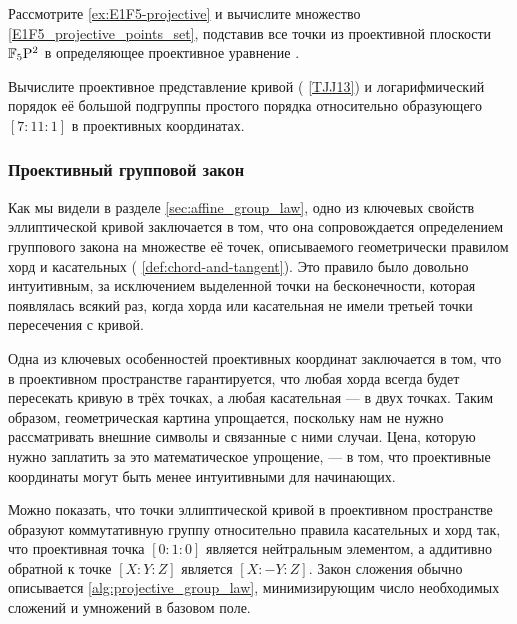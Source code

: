 \begin{exercise}
Рассмотрите \examplename{} \ref{ex:E1F5-projective} и вычислите множество \eqref{E1F5_projective_points_set}, подставив все точки из проективной плоскости $\mathbb{F}_5\mathrm{P}^2$ в определяющее проективное уравнение .
\end{exercise}

\begin{exercise}
Вычислите проективное представление кривой  (\examplename{} \ref{TJJ13}) и логарифмический порядок её большой подгруппы простого порядка относительно образующего $[7:11:1]$ в проективных координатах.
\end{exercise}

\subsubsection{Проективный групповой закон}
\label{sec:projective_group_law}
Как мы видели в разделе \ref{sec:affine_group_law}, одно из ключевых свойств эллиптической кривой заключается в том, что она сопровождается определением группового закона на множестве её точек, описываемого геометрически правилом хорд и касательных ( \ref{def:chord-and-tangent}). Это правило было довольно интуитивным, за исключением выделенной точки на бесконечности, которая появлялась всякий раз, когда хорда или касательная не имели третьей точки пересечения с кривой.

Одна из ключевых особенностей проективных координат заключается в том, что в проективном пространстве гарантируется, что любая хорда всегда будет пересекать кривую в трёх точках, а любая касательная — в двух точках. Таким образом, геометрическая картина упрощается, поскольку нам не нужно рассматривать внешние символы и связанные с ними случаи. Цена, которую нужно заплатить за это математическое упрощение, — в том, что проективные координаты могут быть менее интуитивными для начинающих.

Можно показать, что точки эллиптической кривой в проективном пространстве образуют коммутативную группу относительно правила касательных и хорд так, что проективная точка $[0:1:0]$ является нейтральным элементом, а аддитивно обратной к точке $[X:Y:Z]$ является $[X:-Y:Z]$. Закон сложения обычно описывается \algname{} \ref{alg:projective_group_law}, минимизирующим число необходимых сложений и умножений в базовом поле. %

